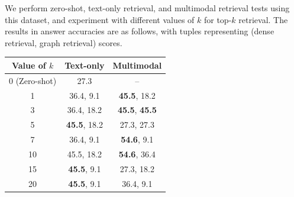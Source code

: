 We perform zero-shot, text-only retrieval, and multimodal retrieval tests using this dataset, and experiment with different values of $k$ for top-$k$ retrieval.
The results in answer accuracies are as follows, with tuples representing (dense retrieval, graph retrieval) scores.
\begin{center}
    \begin{tabular}{ccc}
        \toprule
        Value of $k$ & Text-only & Multimodal \\
        \midrule
        0 (Zero-shot) & 27.3 & -- \\
        1 & 36.4, 9.1 & \textbf{45.5}, 18.2 \\
        3 & 36.4, 18.2 & \textbf{45.5}, \textbf{45.5} \\
        5 & \textbf{45.5}, 18.2 & 27.3, 27.3 \\
        7 & 36.4, 9.1 & \textbf{54.6}, 9.1 \\
        10 & 45.5, 18.2 & \textbf{54.6}, 36.4 \\
        15 & \textbf{45.5}, 9.1 & 27.3, 18.2 \\
        20 & \textbf{45.5}, 9.1 & 36.4, 9.1 \\
        \bottomrule
    \end{tabular}
\end{center}
